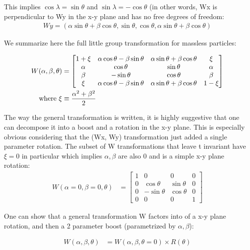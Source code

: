 \documentclass[12pt]{scrartcl}
\begin{document}
This implies $\cos \lambda = \sin \theta$ and $\sin \lambda = -\cos \theta$ (in other words, Wx is perpendicular to Wy in the x-y plane and has no free degrees of freedom:
\begin{align}
Wy =  (\alpha \sin \theta + \beta \cos \theta, \sin \theta,  \cos \theta, \alpha \sin \theta + \beta \cos \theta)
\end{align}

We summarize here the full little group transformation for massless particles:

\begin{align}
W(\alpha, \beta, \theta) &= 
\begin{bmatrix}
1 + \xi & \alpha \cos \theta - \beta \sin \theta & \alpha \sin \theta + \beta \cos \theta & \xi \\
\alpha & \cos \theta & \sin \theta & \alpha \\
\beta & - \sin \theta & \cos \theta & \beta \\
\xi & \alpha \cos \theta - \beta \sin \theta & \alpha \sin \theta + \beta \cos \theta & 1- \xi 
\end{bmatrix}  \\
\text{ where } \xi &\equiv {\alpha^2 + \beta^2 \over 2}
\end{align}

The way the general transformation is written, it is highly suggestive that one can decompose it into a boost
and a rotation in the x-y plane.  This is especially obvious considering that the (Wx, Wy) transformation just added a single parameter rotation. The subset of W transformations that leave t invariant have $\xi = 0$ in particular which implies $\alpha, \beta$ are also 0 and is a simple x-y plane rotation:
\begin{align}
W(\alpha=0, \beta=0, \theta) &= 
\begin{bmatrix}
1  & 0& 0 &0\\
0 & \cos \theta & \sin \theta & 0 \\
0 & - \sin \theta & \cos \theta & 0 \\
0 & 0 & 0 & 1 
\end{bmatrix}
\end{align}

One can show that a general transformation W factors into of a x-y plane rotation, and then a 2 parameter boost (parametrized by $\alpha, \beta$):

\begin{align}
W(\alpha, \beta, \theta) &= W(\alpha, \beta, \theta = 0) \times R(\theta)
\end{align}
\end{document}
